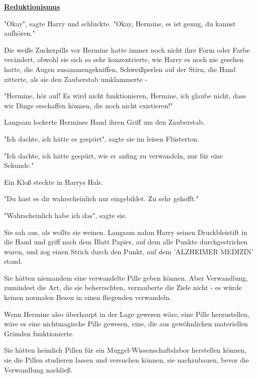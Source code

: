 

\hypertarget{reduktionismus}{%

\textbf{\uline{Reduktionismus}}

"Okay", sagte Harry und schluckte. "Okay, Hermine, es ist genug, du kannst aufhören."

Die weiße Zuckerpille vor Hermine hatte immer noch nicht ihre Form oder Farbe verändert, obwohl sie sich so sehr konzentrierte, wie Harry es noch nie gesehen hatte, die Augen zusammengekniffen, Schweißperlen auf der Stirn, die Hand zitterte, als sie den Zauberstab umklammerte -

"Hermine, hör auf! Es wird nicht funktionieren, Hermine, ich glaube nicht, dass wir Dinge erschaffen können, die noch nicht existieren!"

Langsam lockerte Hermines Hand ihren Griff um den Zauberstab.

"Ich dachte, ich hätte es gespürt", sagte sie im leisen Flüsterton.

"Ich dachte, ich hätte gespürt, wie er anfing zu verwandeln, nur für eine Sekunde."

Ein Kloß steckte in Harrys Hals.

"Du hast es dir wahrscheinlich nur eingebildet. Zu sehr gehofft."

"Wahrscheinlich habe ich das", sagte sie.

Sie sah aus, als wollte sie weinen. Langsam nahm Harry seinen Druckbleistift in die Hand und griff nach dem Blatt Papier, auf dem alle Punkte durchgestrichen waren, und zog einen Strich durch den Punkt, auf dem 'ALZHEIMER MEDIZIN' stand.

Sie hätten niemandem eine verwandelte Pille geben können. Aber Verwandlung, zumindest die Art, die sie beherrschten, verzauberte die Ziele nicht - es würde keinen normalen Besen in einen fliegenden verwandeln.

Wenn Hermine also überhaupt in der Lage gewesen wäre, eine Pille herzustellen, wäre es eine nichtmagische Pille gewesen, eine, die aus gewöhnlichen materiellen Gründen funktionierte.

Sie hätten heimlich Pillen für ein Muggel-Wissenschaftslabor herstellen können, sie die Pillen studieren lassen und versuchen können, sie nachzubauen, bevor die Verwandlung nachließ.

}
